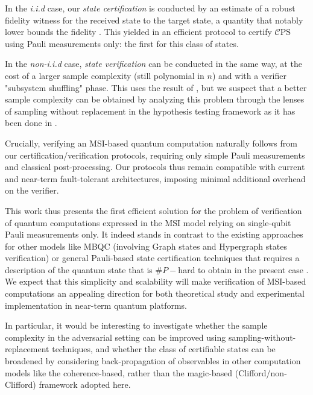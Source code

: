 \documentclass[a4paper,twocolumn,11pt,unpublished]{quantumarticle}
\newcommand{\mCEPS}{\mathcal{C}\text{PS}}
\begin{document}
In the \emph{i.i.d} case, our \emph{state certification} is conducted by an estimate of a robust fidelity witness for the received state to the target state, a quantity that notably lower bounds the fidelity \cite{CGKM21efficient}. This yielded in an efficient protocol to certify $\mCEPS$ using Pauli measurements only: the first for this class of states.

In the \emph{non-i.i.d} case, \emph{state verification} can be conducted in the same way, at the cost of a larger sample
complexity (still polynomial in $n$) and with a verifier "subsystem shuffling" phase. This uses the result of \cite{FKMO24learning}, but we suspect that a better sample complexity can be obtained by analyzing this problem through the lenses of sampling without replacement in the hypothesis testing framework as it has been done in \cite{LZH23robust}. 

Crucially, verifying an MSI-based quantum computation naturally follows from our certification/verification protocols, requiring only simple Pauli measurements and classical post-processing. Our protocols thus remain compatible with current and near-term fault-tolerant architectures, imposing minimal additional overhead on the verifier.




 This work thus presents the first efficient solution for the problem of verification of quantum computations expressed in the MSI model relying on single-qubit Pauli measurements only. It indeed stands in contrast to the existing approaches for other models like MBQC (involving Graph states and Hypergraph states verification) or general Pauli-based state certification techniques that requires a description of the quantum state that is $\#P-$hard to obtain in the present case \cite{YJS18quantum}. 
 We expect that this simplicity and scalability will make verification of MSI-based computations an appealing direction for both theoretical study and experimental implementation in near-term quantum platforms.

In particular, it would be interesting to investigate whether the sample complexity in the adversarial setting can be improved using sampling-without-replacement techniques, and whether the class of certifiable states can be broadened by considering back-propagation of observables in other computation models like the coherence-based, rather than the magic-based (Clifford/non-Clifford) framework adopted here.

 

 
\end{document}
